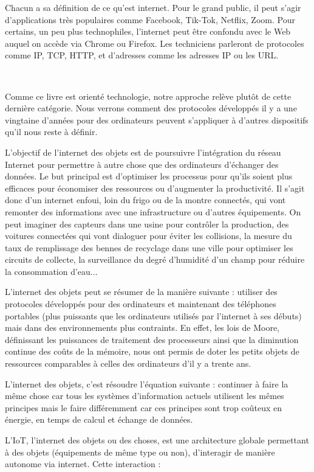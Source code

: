 Chacun a sa définition de ce qu’est internet. Pour le grand public, il peut s’agir d’applications très populaires comme Facebook, Tik-Tok, Netflix, Zoom. Pour certains, un peu plus technophiles, l’internet peut être confondu avec le Web auquel on accède via Chrome ou Firefox. Les techniciens parleront de protocoles comme IP, TCP, HTTP, et d’adresses comme les adresses IP ou les URL.

~~

Comme ce livre est orienté technologie, notre approche relève plutôt de cette dernière catégorie. Nous verrons comment des protocoles développés il y a une vingtaine d’années pour des ordinateurs peuvent s’appliquer à d’autres dispositifs qu’il nous reste à définir.

L'objectif de l'internet des objets est de poursuivre l'intégration du réseau Internet pour permettre à autre chose que des ordinateurs d'échanger des données. Le but principal est d'optimiser les processus pour qu'ils soient plus efficaces pour économiser des ressources ou d'augmenter la productivité. Il s'agit donc d'un internet enfoui, loin du frigo ou de la montre connectés, qui vont remonter des informations avec une infrastructure ou d'autres équipements. On peut imaginer des capteurs dans une usine pour contrôler la production, des voitures connectées qui vont dialoguer pour éviter les collisions, la mesure du taux de remplissage des bennes de recyclage dans une ville pour optimiser les circuits de collecte, la surveillance du degré d'humidité d'un champ pour réduire la consommation d'eau...


L’internet des objets peut se résumer de la manière suivante : utiliser des protocoles développés pour des ordinateurs et maintenant des téléphones portables (plus puissants que les ordinateurs utilisés par l’internet à ses débuts) mais dans des environnements plus contraints. En effet, les lois de Moore, définissant les puissances de traitement des processeurs ainsi que la diminution continue des coûts de la mémoire, nous ont permis de doter les petits objets de ressources comparables à celles des ordinateurs d’il y a trente ans.

L’internet des objets, c’est résoudre l’équation suivante : continuer à faire la même chose car tous les systèmes d’information actuels utilisent les mêmes principes mais le faire différemment car ces principes sont trop coûteux en énergie, en temps de calcul et échange de données.

L’\ac{IoT}, l’internet des objets ou des choses, est une architecture globale permettant à des objets (équipements de même type ou non), d’interagir de manière autonome via internet. Cette interaction :

